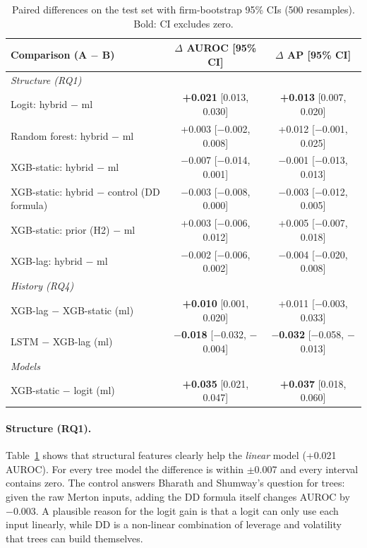 \begin{table}[htbp]
\centering
\small
\begin{tabular}{lcc}
\toprule
Comparison (A $-$ B) & $\Delta$ AUROC [95\% CI] & $\Delta$ AP [95\% CI] \\
\midrule
\multicolumn{3}{l}{\emph{Structure (RQ1)}} \\
Logit: hybrid $-$ ml & \textbf{+0.021} [0.013, 0.030] & \textbf{+0.013} [0.007, 0.020] \\
Random forest: hybrid $-$ ml & +0.003 [$-$0.002, 0.008] & +0.012 [$-$0.001, 0.025] \\
XGB-static: hybrid $-$ ml & $-$0.007 [$-$0.014, 0.001] & $-$0.001 [$-$0.013, 0.013] \\
XGB-static: hybrid $-$ control (DD formula) & $-$0.003 [$-$0.008, 0.000] & $-$0.003 [$-$0.012, 0.005] \\
XGB-static: prior (H2) $-$ ml & +0.003 [$-$0.006, 0.012] & +0.005 [$-$0.007, 0.018] \\
XGB-lag: hybrid $-$ ml & $-$0.002 [$-$0.006, 0.002] & $-$0.004 [$-$0.020, 0.008] \\
\midrule
\multicolumn{3}{l}{\emph{History (RQ4)}} \\
XGB-lag $-$ XGB-static (ml) & \textbf{+0.010} [0.001, 0.020] & +0.011 [$-$0.003, 0.033] \\
LSTM $-$ XGB-lag (ml) & \textbf{$-$0.018} [$-$0.032, $-$0.004] & \textbf{$-$0.032} [$-$0.058, $-$0.013] \\
\midrule
\multicolumn{3}{l}{\emph{Models}} \\
XGB-static $-$ logit (ml) & \textbf{+0.035} [0.021, 0.047] & \textbf{+0.037} [0.018, 0.060] \\
\bottomrule
\end{tabular}
\caption{Paired differences on the test set with firm-bootstrap 95\% CIs (500 resamples). Bold: CI excludes zero.}
\label{tab:deltas}
\end{table}

\paragraph{Structure (RQ1).} Table~\ref{tab:deltas} shows that structural features clearly help the
\emph{linear} model (+0.021 AUROC). For every tree model the difference is within $\pm$0.007 and every
interval contains zero. The control answers Bharath and Shumway's question for trees: given the raw Merton
inputs, adding the DD formula itself changes AUROC by $-0.003$. A plausible reason for the logit gain is that
a logit can only use each input linearly, while DD is a non-linear combination of leverage and volatility
that trees can build themselves.

